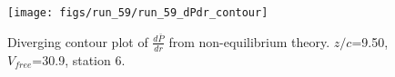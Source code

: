 \begin{figure}[H]
\centering
\texttt{[image: figs/run\_59/run\_59\_dPdr\_contour]}
\caption{Diverging contour plot of $\frac{d\bar{P}}{dr}$ from non-equilibrium theory. $z/c$=9.50, $V_{free}$=30.9, station 6.}
\label{fig:run_59_dPdr_contour}
\end{figure}


